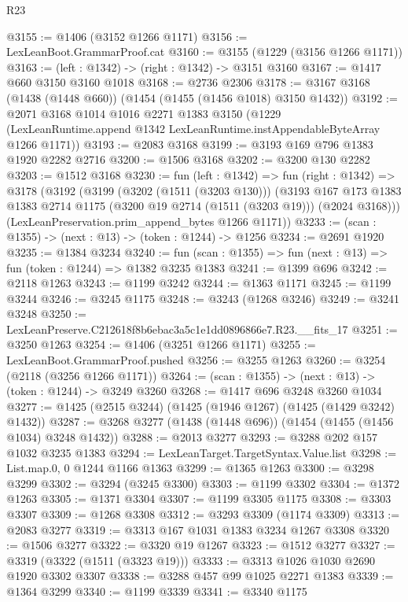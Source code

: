 \begin{lexlean}{R23}
\begin{coremodule}
@3155 := @1406 (@3152 @1266 @1171)
@3156 := LexLeanBoot.GrammarProof.cat
@3160 := @3155 (@1229 (@3156 @1266 @1171))
@3163 := (left : @1342) -> (right : @1342) -> @3151 @3160
@3167 := @1417 @660 @3150 @3160 @1018
@3168 := @2736 @2306
@3178 := @3167 @3168 (@1438 (@1448 @660)) (@1454 (@1455 (@1456 @1018) @3150 @1432))
@3192 := @2071
    @3168
    @1014
    @1016
    @2271
    @1383
    @3150
    (@1229 (LexLeanRuntime.append @1342 LexLeanRuntime.instAppendableByteArray @1266 @1171))
@3193 := @2083 @3168
@3199 := @3193 @169 @796 @1383 @1920 @2282 @2716
@3200 := @1506 @3168
@3202 := @3200 @130 @2282
@3203 := @1512 @3168
@3230 := fun (left : @1342) =>
  fun (right : @1342) =>
  @3178
    (@3192
      (@3199
        (@3202 (@1511 (@3203 @130)))
        (@3193
          @167
          @173
          @1383
          @1383
          @2714
          @1175
          (@3200 @19 @2714 (@1511 (@3203 @19)))
          (@2024 @3168)))
      (LexLeanPreservation.prim_append_bytes @1266 @1171))
@3233 := (scan : @1355) -> (next : @13) -> (token : @1244) -> @1256
@3234 := @2691 @1920
@3235 := @1384 @3234
@3240 := fun (scan : @1355) => fun (next : @13) => fun (token : @1244) => @1382 @3235 @1383
@3241 := @1399 @696
@3242 := @2118 @1263
@3243 := @1199 @3242
@3244 := @1363 @1171
@3245 := @1199 @3244
@3246 := @3245 @1175
@3248 := @3243 (@1268 @3246)
@3249 := @3241 @3248
@3250 := LexLeanPreserve.C212618f8b6ebac3a5c1e1dd0896866e7.R23.__fits_17
@3251 := @3250 @1263
@3254 := @1406 (@3251 @1266 @1171)
@3255 := LexLeanBoot.GrammarProof.pushed
@3256 := @3255 @1263
@3260 := @3254 (@2118 (@3256 @1266 @1171))
@3264 := (scan : @1355) -> (next : @13) -> (token : @1244) -> @3249 @3260
@3268 := @1417 @696 @3248 @3260 @1034
@3277 := @1425 (@2515 @3244) (@1425 (@1946 @1267) (@1425 (@1429 @3242) @1432))
@3287 := @3268 @3277 (@1438 (@1448 @696)) (@1454 (@1455 (@1456 @1034) @3248 @1432))
@3288 := @2013 @3277
@3293 := @3288 @202 @157 @1032 @3235 @1383
@3294 := LexLeanTarget.TargetSyntax.Value.list
@3298 := List.map.{0, 0} @1244 @1166 @1363
@3299 := @1365 @1263
@3300 := @3298 @3299
@3302 := @3294 (@3245 @3300)
@3303 := @1199 @3302
@3304 := @1372 @1263
@3305 := @1371 @3304
@3307 := @1199 @3305 @1175
@3308 := @3303 @3307
@3309 := @1268 @3308
@3312 := @3293 @3309 (@1174 @3309)
@3313 := @2083 @3277
@3319 := @3313 @167 @1031 @1383 @3234 @1267 @3308
@3320 := @1506 @3277
@3322 := @3320 @19 @1267
@3323 := @1512 @3277
@3327 := @3319 (@3322 (@1511 (@3323 @19)))
@3333 := @3313 @1026 @1030 @2690 @1920 @3302 @3307
@3338 := @3288 @457 @99 @1025 @2271 @1383
@3339 := @1364 @3299
@3340 := @1199 @3339
@3341 := @3340 @1175

\end{coremodule}
\end{lexlean}
